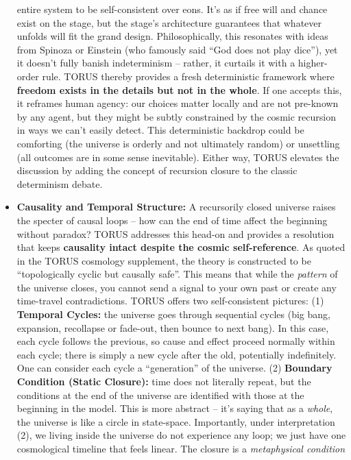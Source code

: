 \begin{itemize}
  entire system to be self-consistent over eons​. It's as if free will
  and chance exist on the stage, but the stage's architecture guarantees
  that whatever unfolds will fit the grand design. Philosophically, this
  resonates with ideas from Spinoza or Einstein (who famously said ``God
  does not play dice''), yet it doesn't fully banish indeterminism --
  rather, it curtails it with a higher-order rule. TORUS thereby
  provides a fresh deterministic framework where \textbf{freedom exists
  in the details but not in the whole}. If one accepts this, it reframes
  human agency: our choices matter locally and are not pre-known by any
  agent, but they might be subtly constrained by the cosmic recursion in
  ways we can't easily detect. This deterministic backdrop could be
  comforting (the universe is orderly and not ultimately random) or
  unsettling (all outcomes are in some sense inevitable). Either way,
  TORUS elevates the discussion by adding the concept of recursion
  closure to the classic determinism debate.
\item
  \textbf{Causality and Temporal Structure:} A recursorily closed
  universe raises the specter of causal loops -- how can the end of time
  affect the beginning without paradox? TORUS addresses this head-on and
  provides a resolution that keeps \textbf{causality intact despite the
  cosmic self-reference}. As quoted in the TORUS cosmology supplement,
  the theory is constructed to be ``topologically cyclic but causally
  safe''​. This means that while the \emph{pattern} of the universe
  closes, you cannot send a signal to your own past or create any
  time-travel contradictions. TORUS offers two self-consistent pictures:
  (1) \textbf{Temporal Cycles:} the universe goes through sequential
  cycles (big bang, expansion, recollapse or fade-out, then bounce to
  next bang)​. In this case, each cycle follows the previous, so cause
  and effect proceed normally within each cycle; there is simply a new
  cycle after the old, potentially indefinitely. One can consider each
  cycle a ``generation'' of the universe. (2) \textbf{Boundary Condition
  (Static Closure):} time does not literally repeat, but the conditions
  at the end of the universe are identified with those at the beginning
  in the model​. This is more abstract -- it's saying that as a
  \emph{whole}, the universe is like a circle in state-space.
  Importantly, under interpretation (2), we living inside the universe
  do not experience any loop; we just have one cosmological timeline
  that feels linear. The closure is a \emph{metaphysical condition}

\end{itemize}

